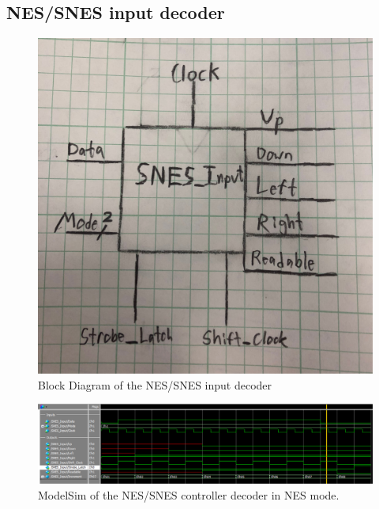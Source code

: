 \documentclass[]{article}
\begin{document}
\subsection{NES/SNES input decoder}
\begin{figure}[H]\centering
	\includegraphics[width=\linewidth]{figures/SNES_Input_Diagram}
	\caption{Block Diagram of the NES/SNES input decoder}
\end{figure}
\begin{figure}[H]\centering
	\includegraphics[width=\linewidth]{figures/NES_Input_Sim.png}
	\caption{ModelSim of the NES/SNES controller decoder in NES mode.}
\end{figure}
\end{document}
